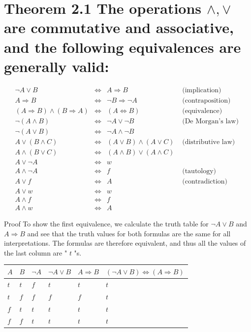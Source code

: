 \documentclass[10pt]{book}
\begin{document}
\section*{Theorem 2.1 The operations $\wedge, \vee$ are commutative and associative, and the following equivalences are generally valid:}
$$
\begin{aligned}
\neg A \vee B & \Leftrightarrow & A \Rightarrow B & \text { (implication) } \\
A \Rightarrow B & \Leftrightarrow & \neg B \Rightarrow \neg A & \text { (contraposition) } \\
(A \Rightarrow B) \wedge(B \Rightarrow A) & \Leftrightarrow & (A \Leftrightarrow B) & \text { (equivalence) } \\
\neg(A \wedge B) & \Leftrightarrow & \neg A \vee \neg B & \text { (De Morgan's law) } \\
\neg(A \vee B) & \Leftrightarrow & \neg A \wedge \neg B & \\
A \vee(B \wedge C) & \Leftrightarrow & (A \vee B) \wedge(A \vee C) & \text { (distributive law) } \\
A \wedge(B \vee C) & \Leftrightarrow & (A \wedge B) \vee(A \wedge C) & \\
A \vee \neg A & \Leftrightarrow & w & \\
A \wedge \neg A & \Leftrightarrow & f & \text { (tautology) } \\
A \vee f & \Leftrightarrow & A & \text { (contradiction) } \\
A \vee w & \Leftrightarrow & w & \\
A \wedge f & \Leftrightarrow & f & \\
A \wedge w & \Leftrightarrow & A &
\end{aligned}
$$

Proof To show the first equivalence, we calculate the truth table for $\neg A \vee B$ and $A \Rightarrow B$ and see that the truth values for both formulas are the same for all interpretations. The formulas are therefore equivalent, and thus all the values of the last column are " $t$ "s.

\begin{center}
\begin{tabular}{llllll}
\hline
$A$ & $B$ & $\neg A$ & $\neg A \vee B$ & $A \Rightarrow B$ & $(\neg A \vee B) \Leftrightarrow(A \Rightarrow B)$ \\
\hline
$t$ & $t$ & $f$ & $t$ & $t$ & $t$ \\
\hline
$t$ & $f$ & $f$ & $f$ & $f$ & $t$ \\
\hline
$f$ & $t$ & $t$ & $t$ & $t$ & $t$ \\
\hline
$f$ & $f$ & $t$ & $t$ & $t$ & $t$ \\
\hline
\end{tabular}
\end{center}
\end{document}
